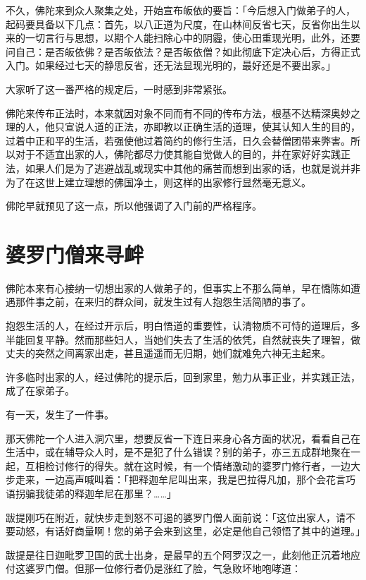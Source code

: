 \documentclass[12pt,twoside,openany]{book}
\begin{document}
不久，佛陀来到众人聚集之处，开始宣布皈依的要旨：「今后想入门做弟子的人，起码要具备以下几点：首先，以八正道为尺度，在山林间反省七天，反省你出生以来的一切言行与思想，以期个人能扫除心中的阴霾，使心田重现光明，此外，还要问自己：是否皈依佛？是否皈依法？是否皈依僧？如此彻底下定决心后，方得正式入门。如果经过七天的静思反省，还无法显现光明的，最好还是不要出家。」

大家听了这一番严格的规定后，一时感到非常紧张。

佛陀来传布正法时，本来就因对象不同而有不同的传布方法，根基不达精深奥妙之理的人，他只宣说人道的正法，亦即教以正确生活的道理，使其认知人生的目的，过着中正和平的生活，若强使他过着简约的修行生活，日久会替僧团带来弊害。所以对于不适宜出家的人，佛陀都尽力使其能自觉做人的目的，并在家好好实践正法，如果人们是为了逃避战乱或现实中其他的痛苦而想到出家的话，也就是说并非为了在这世上建立理想的佛国净土，则这样的出家修行显然毫无意义。

佛陀早就预见了这一点，所以他强调了入门前的严格程序。

\section{婆罗门僧来寻衅}\label{sec3.9}

佛陀本来有心接纳一切想出家的人做弟子的，但事实上不那么简单，早在憍陈如遭遇那件事之前，在来归的群众间，就发生过有人抱怨生活简陋的事了。

抱怨生活的人，在经过开示后，明白悟道的重要性，认清物质不可恃的道理后，多半能回复平静。然而那些妇人，当她们失去了生活的依凭，自然就丧失了理智，做丈夫的突然之间离家出走，甚且遥遥而无归期，她们就难免六神无主起来。

许多临时出家的人，经过佛陀的提示后，回到家里，勉力从事正业，并实践正法，成了在家弟子。

有一天，发生了一件事。

那天佛陀一个人进入洞穴里，想要反省一下连日来身心各方面的状况，看看自己在生活中，或在辅导众人时，是不是犯了什么错误？别的弟子，亦三五成群地聚在一起，互相检讨修行的得失。就在这时候，有一个情绪激动的婆罗门修行者，一边大步走来，一边高声喊叫着：「把释迦牟尼叫出来，我是巴拉得凡加，那个会花言巧语拐骗我徒弟的释迦牟尼在那里？……」

跋提刚巧在附近，就快步走到怒不可遏的婆罗门僧人面前说：「这位出家人，请不要动怒，有话好商量啊！您的弟子会来到这里，必定是他自己领悟了其中的道理。」

跋提是往日迦毗罗卫国的武士出身，是最早的五个阿罗汉之一，此刻他正沉着地应付这婆罗门僧。但那一位修行者仍是涨红了脸，气急败坏地咆哮道：
\end{document}
